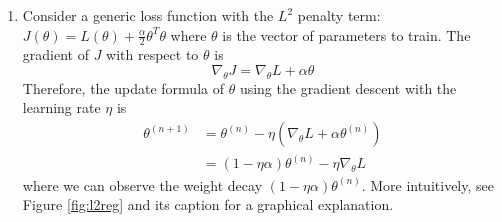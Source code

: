 \documentclass[
	12pt, %
]{../Template/fphw}
\begin{document}
\begin{enumerate}[label = (\arabic*)] %
	\item Consider a generic loss function with the $L^2$ penalty term: $J(\theta)= L(\theta)+\frac{\alpha}{2} \theta^{T} \theta$ where $\theta$ is the vector of parameters to train. The gradient of $J$ with respect to $\theta$ is 
    \begin{equation}
        \nabla_{\theta} J = \nabla_{\theta} L + \alpha \theta 
    \end{equation}
    Therefore, the update formula of $\theta$ using the gradient descent with the learning rate $\eta$ is 
    \begin{align}
        \theta^{(n+1)} &= \theta^{(n)} - \eta\left(\nabla_{\theta} L + \alpha \theta^{(n)} \right) \\
        &= (1-\eta \alpha )\theta^{(n)} - \eta \nabla_{\theta}L
    \end{align}
    where we can observe the weight decay $(1-\eta \alpha )\theta^{(n)}$. More intuitively, see Figure \ref{fig:l2reg} and its caption for a graphical explanation. 
    \begin{figure}[!htbp]
    \centering
{} %

\begin{tikzpicture}[x=0.75pt,y=0.75pt,yscale=-1,xscale=1]


\end{tikzpicture}
\end{figure}
\end{enumerate}
\end{document}
